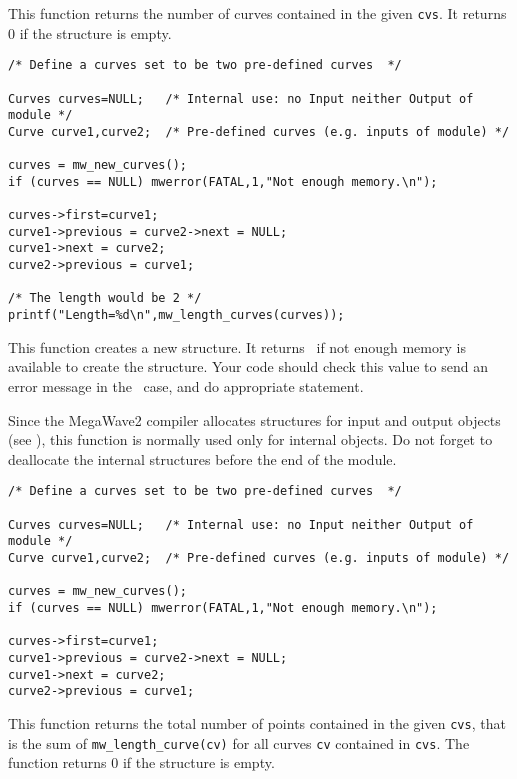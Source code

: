 \Description
This function returns the number of curves contained in the given
\verb+cvs+. It returns $0$ if the structure is empty.

\Next
\Example
\begin{verbatim}
/* Define a curves set to be two pre-defined curves  */

Curves curves=NULL;   /* Internal use: no Input neither Output of module */
Curve curve1,curve2;  /* Pre-defined curves (e.g. inputs of module) */

curves = mw_new_curves();
if (curves == NULL) mwerror(FATAL,1,"Not enough memory.\n");

curves->first=curve1;
curve1->previous = curve2->next = NULL;
curve1->next = curve2;
curve2->previous = curve1;

/* The length would be 2 */
printf("Length=%d\n",mw_length_curves(curves));

\end{verbatim}
\newpage %

\Description
This function creates a new \curves structure.
It returns \Null\ if not enough memory is available to create the structure.
Your code should check this value to send an
error message in the \Null\ case, and do appropriate statement.

Since the MegaWave2 compiler allocates structures for input and output 
objects (see \volI), this function is normally used only for internal objects.
Do not forget to deallocate the internal structures before the end
of the module.

\Next
\Example
\begin{verbatim}
/* Define a curves set to be two pre-defined curves  */

Curves curves=NULL;   /* Internal use: no Input neither Output of module */
Curve curve1,curve2;  /* Pre-defined curves (e.g. inputs of module) */

curves = mw_new_curves();
if (curves == NULL) mwerror(FATAL,1,"Not enough memory.\n");

curves->first=curve1;
curve1->previous = curve2->next = NULL;
curve1->next = curve2;
curve2->previous = curve1;
\end{verbatim}
\newpage %

\Description
This function returns the total number of points contained in the given
\verb+cvs+, that is the sum of \verb+mw_length_curve(cv)+ for all
curves \verb+cv+ contained in \verb+cvs+.
The function returns $0$ if the structure is empty.

\newpage %

